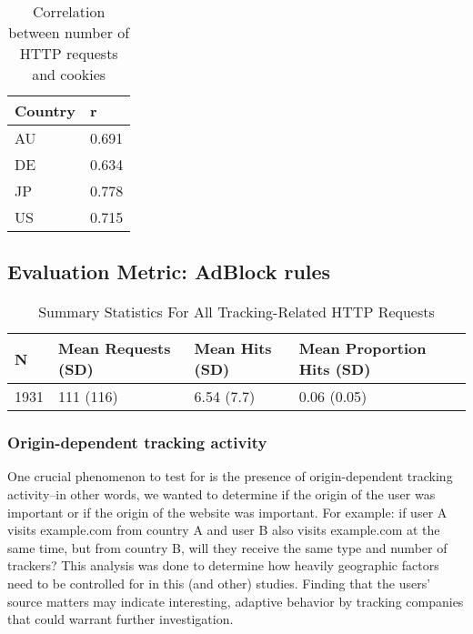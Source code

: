 \documentclass[conference]{IEEEtran}
\begin{document}
\begin{table}[t]
\centering
\caption{Correlation between number of HTTP requests and cookies}
\label{correlation}
\begin{tabular}{|l|l|}
\hline
\textbf{Country} & \textbf{r} \\ \hline
AU               & 0.691      \\ \hline
DE               & 0.634      \\ \hline
JP               & 0.778      \\ \hline
US               & 0.715   \\  \hline
\end{tabular}
\end{table}


\subsection{Evaluation Metric: AdBlock rules}


\begin{table*}[t]
\centering
\caption{Summary Statistics For All Tracking-Related HTTP Requests}
\label{summaryTracking}
\begin{tabular}{|l|l|l|l|}
\hline
\textbf{N} & \textbf{Mean Requests (SD)} & \textbf{Mean Hits (SD)} & \textbf{Mean Proportion Hits (SD)} \\ \hline
1931       & 111 (116)                   & 6.54 (7.7)              & 0.06 (0.05)                        \\ \hline
\end{tabular}
\end{table*}


\subsubsection{Origin-dependent tracking activity}

One crucial phenomenon to test for is the presence of origin-dependent tracking activity--in other words, we wanted to determine if the origin of the user was important or if the origin of the website was important. For example: if user A visits example.com from country A and user B also visits example.com at the same time, but from country B, will they receive the same type and number of trackers?  This analysis was done to determine how heavily geographic factors need to be controlled for in this (and other) studies. Finding that the users' source matters may indicate interesting, adaptive behavior by tracking companies that could warrant further investigation.
\end{document}
